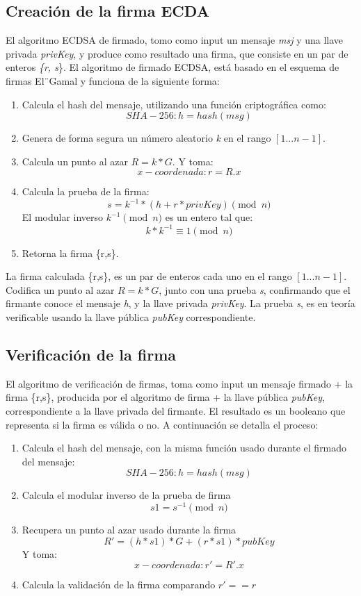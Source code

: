 \subsection{Creación de la firma ECDA}

\noindent El algoritmo ECDSA de firmado, tomo como input un mensaje \textit{msj} y una llave privada \textit{privKey}, y produce como resultado una firma, que consiste en un par de enteros \textit{\{r, s}\}.
El algoritmo de firmado ECDSA, está basado en el esquema de firmas El¨Gamal y funciona de la siguiente forma:


\begin{enumerate}
\item Calcula el hash del mensaje, utilizando una función criptográfica como: \[SHA-256: h = hash(msg) \]
\item Genera de forma segura un número aleatorio \textit{k} en el rango \([1...n-1]\). 
\item Calcula un punto al azar \( R = k * G\). Y toma:
 \[ x-coordenada: r = R.x \]
\item Calcula la prueba de la firma:
  \[  s = k^{-1} * (h + r * privKey)\pmod{n} \]
  El modular inverso \( k^{-1} \pmod{n}\) es un entero tal que: 
  \[ k * k^{-1} \equiv 1 \pmod{n}\]
\item Retorna la firma \{r,s\}.
\end{enumerate}

\noindent La firma calculada \{r,s\}, es un par de enteros cada uno en el rango \([1...n-1]\). Codifica un punto al azar \( R = k * G\), junto con una prueba \textit{s}, confirmando que el firmante conoce el mensaje \textit{h}, y la llave privada \textit{privKey}. La prueba \textit{s}, es en teoría verificable usando la llave pública \textit{pubKey} correspondiente.

\bigskip
\subsection{Verificación de la firma}

El algoritmo de verificación de firmas, toma como input un mensaje firmado + la firma \{r,s\}, producida por el algoritmo de firma + la llave pública \textit{pubKey}, correspondiente a la llave privada del firmante. El resultado es un booleano que representa si la firma es válida o no. A continuación se detalla el proceso: 

\begin{enumerate}
\item Calcula el hash del mensaje, con la misma función usado durante el firmado del mensaje:
 \[SHA-256: h = hash(msg) \]
\item Calcula el modular inverso de la prueba de firma
\[s1 = s^{-1} \pmod n \]
\item Recupera un punto al azar usado durante la firma
\[R' = (h * s1) * G + (r * s1) * pubKey \]
 Y toma:
 \[ x-coordenada: r' = R'.x \]
 \item Calcula la validación de la firma comparando \(r' == r\)

 \end{enumerate}

